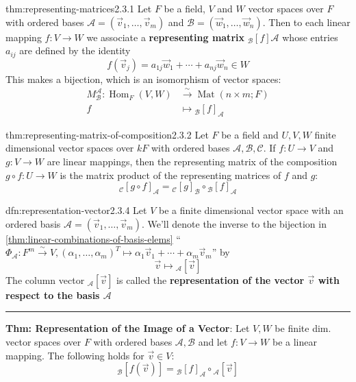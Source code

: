 \documentclass[landscape, 8pt]{extarticle}
\DeclareMathOperator{\Mat}{Mat}
\DeclareMathOperator{\Hom}{Hom}
\begin{document}
\begin{multicols}{3}
\begin{thm}{thm:representing-matrices}{2.3.1}
    Let $F$ be a field, $V$ and $W$ vector spaces over $F$ with ordered bases $\mathcal{A} = (\vec{v}_{1},\dots,\vec{v}_{m})$ and $\mathcal{B} = (\vec{w}_{1},\dots,\vec{w}_{n})$. Then to each linear mapping $f : V \to W$ we associate a \textbf{representing matrix} $_{\mathcal{B}}[f]\mathcal{A}$ whose entries $a_{ij}$ are defined by the identity
    \[f(\vec{v}_{j}) = a_{1j}\vec{w}_{1} + \cdots + a_{nj}\vec{w}_{n}\in W\]
    This makes a bijection, which is an isomorphism of vector spaces:
    \begin{align*}
        M^{\mathcal{A}}_{\mathcal{B}} : \Hom_{F}(V, W) &\xrightarrow{\sim} \Mat(n \times m; F) \\
        f &\mapsto {}_{\mathcal{B}}[f]_{\mathcal{A}}
    \end{align*}
\end{thm}

\begin{thm}{thm:representing-matrix-of-composition}{2.3.2}
    Let $F$ be a field and $U,V,W$ finite dimensional vector spaces over $kF$ with ordered bases $\mathcal{A}, \mathcal{B}, \mathcal{C}$. If $f : U \to V$ and $g : V \to W$ are linear mappings, then the representing matrix of the composition $g \circ f : U \to W$ is the matrix product of the representing matrices of $f$ and $g$:
    \[{}_{\mathcal{C}}[g \circ f]_{\mathcal{A}} = {}_{\mathcal{C}}[g]_{\mathcal{B}} \circ {}_{\mathcal{B}}[f]_{\mathcal{A}}\]
\end{thm}

\newpage
\begin{dfn}{dfn:representation-vector}{2.3.4}
    Let $V$ be a finite dimensional vector space with an ordered basis $\mathcal{A} = (\vec{v}_{1},\dots,\vec{v}_{m})$. We'll denote the inverse to the bijection in \ref{thm:linear-combinations-of-basis-elems} ``$\Phi_{\mathcal{A}} : F^{m} \xrightarrow{\sim} V, (\alpha_{1},\dots,\alpha_{m})^{T} \mapsto \alpha_{1}\vec{v}_{1} +\cdots + \alpha_{m}\vec{v}_{m}$'' by
    \[\vec{v} \mapsto {}_{\mathcal{A}}[\vec{v}]\]
    The column vector ${}_{\mathcal{A}}[\vec{v}]$ is called the \textbf{representation of the vector $\vec{v}$ with respect to the basis $\mathcal{A}$}

    \noindent\rule{\textwidth}{0.2pt}
    \textbf{Thm: Representation of the Image of a Vector}: Let $V,W$ be finite dim. vector spaces over $F$ with ordered bases $\mathcal{A}, \mathcal{B}$ and let $f : V \to W$ be a linear mapping. The following holds for $\vec{v}\in V$:
    \[{}_{\mathcal{B}}[f(\vec{v})] = {}_{\mathcal{B}}[f]_{\mathcal{A}}\circ {}_{\mathcal{A}}[\vec{v}]\]
\end{dfn}



\end{multicols}
\end{document}
